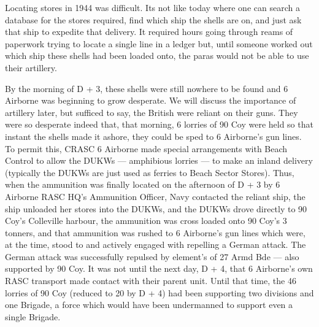 \documentclass[noraggedright]{turabian-researchpaper}
\begin{document}
Locating stores in 1944 was difficult.  Its not like today where one can 
search a database for the stores required, find which ship the shells are on, 
and just ask that ship to expedite that delivery.  It required hours going 
through reams of paperwork trying to locate a single line in a ledger but, 
until 
someone worked out which ship these shells had been loaded onto, the paras
would not be able to use their artillery. 

By the morning of D + 3, these shells were still nowhere to be found and 6
Airborne was beginning to grow desperate.  We will discuss the importance of
artillery later, but sufficed to say, the British were reliant on their
guns.  They were so desperate indeed that, that morning, 6 lorries of 90 Coy
were held so that instant the shells made it 
ashore, they could be sped to 6 Airborne's gun lines.  To permit this, CRASC
6 Airborne made special arrangements with Beach Control to allow the DUKWs
--- amphibious lorries --- to make an inland delivery (typically the DUKWs
are just used as ferries to Beach Sector Stores).  %
Thus, when the ammunition was finally located on the afternoon of D + 3 by
6 Airborne RASC HQ's Ammunition Officer, Navy contacted the reliant ship,
the ship unloaded her stores into the DUKWs, and the
DUKWs drove directly to 90 Coy's Colleville harbour, the ammunition was 
cross loaded onto 90 Coy's 3 tonners, and that ammunition was rushed to 6
Airborne's gun lines which were, at the time, stood to and actively engaged 
with repelling a German attack.\autocite[7-8]{90wdjun}
The German attack was successfully repulsed
by element's of 27 Armd Bde --- also supported by 90 Coy.  It was not until 
the next day, D + 4, that 6 Airborne's own RASC transport made contact with
their parent unit.  Until that time, the 46 lorries of 90 Coy (reduced to 20 
by D + 4) had been supporting two divisions and one Brigade, a force which 
would have been undermanned to support even a single Brigade.  
\end{document}
